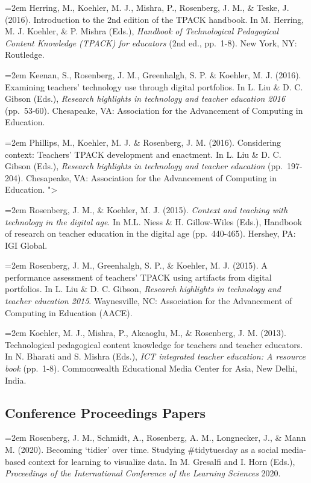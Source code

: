 \documentclass[
  11pt,
]{article}
\begin{document}
\hangindent=2em Herring, M., Koehler, M. J., Mishra, P., Rosenberg, J.
M., \& Teske, J. (2016). Introduction to the 2nd edition of the TPACK
handbook. In M. Herring, M. J. Koehler, \& P. Mishra (Eds.),
\emph{Handbook of Technological Pedagogical Content Knowledge (TPACK)
for educators} (2nd ed., pp.~1-8). New York, NY: Routledge.

\hangindent=2em Keenan, S., Rosenberg, J. M., Greenhalgh, S. P. \&
Koehler, M. J. (2016). Examining teachers' technology use through
digital portfolios. In L. Liu \& D. C. Gibson (Eds.), \emph{Research
highlights in technology and teacher education 2016} (pp.~53-60).
Chesapeake, VA: Association for the Advancement of Computing in
Education.

\hangindent=2em Phillips, M., Koehler, M. J. \& Rosenberg, J. M. (2016).
Considering context: Teachers' TPACK development and enactment. In L.
Liu \& D. C. Gibson (Eds.), \emph{Research highlights in technology and
teacher education} (pp.~197-204). Chesapeake, VA: Association for the
Advancement of Computing in Education. "\textgreater{}

\hangindent=2em Rosenberg, J. M., \& Koehler, M. J. (2015).
\emph{Context and teaching with technology in the digital age}. In M.L.
Niess \& H. Gillow-Wiles (Eds.), Handbook of research on teacher
education in the digital age (pp.~440-465). Hershey, PA: IGI Global.

\hangindent=2em Rosenberg, J. M., Greenhalgh, S. P., \& Koehler, M. J.
(2015). A performance assessment of teachers' TPACK using artifacts from
digital portfolios. In L. Liu \& D. C. Gibson, \emph{Research highlights
in technology and teacher education 2015}. Waynesville, NC: Association
for the Advancement of Computing in Education (AACE).

\hangindent=2em Koehler, M. J., Mishra, P., Akcaoglu, M., \& Rosenberg,
J. M. (2013). Technological pedagogical content knowledge for teachers
and teacher educators. In N. Bharati and S. Mishra (Eds.), \emph{ICT
integrated teacher education: A resource book} (pp.~1-8). Commonwealth
Educational Media Center for Asia, New Delhi, India.

\hypertarget{conference-proceedings-papers}{%
\subsection{Conference Proceedings
Papers}\label{conference-proceedings-papers}}

\hangindent=2em Rosenberg, J. M., Schmidt, A., Rosenberg, A. M.,
Longnecker, J., \& Mann M. (2020). Becoming `tidier' over time. Studying
\#tidytuesday as a social media-based context for learning to visualize
data. In M. Gresalfi and I. Horn (Eds.), \emph{Proceedings of the
International Conference of the Learning Sciences} 2020.
\end{document}
